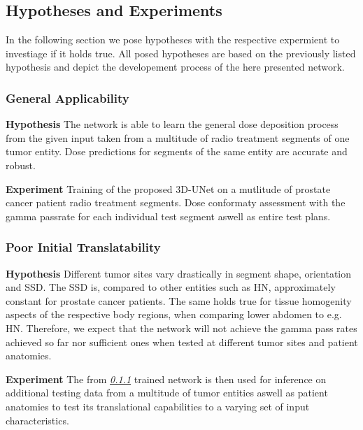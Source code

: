 \subsection{Hypotheses and Experiments}

In the following section we pose hypotheses with the respective expermient to investiage if it holds true. All posed hypotheses are based on the previously listed hypothesis and depict the developement process of the here presented network. 

\subsubsection{General Applicability}\label{sssec:H1}
\begin{hanginglist}\itemsep2pt

    \item\textbf{Hypothesis}\newline
    The network is able to learn the general dose deposition process from the given input taken from a multitude of radio treatment segments of one tumor entity. 
    Dose predictions for segments of the same entity are accurate and robust.\newpage

    \item\textbf{Experiment}\newline
    Training of the proposed 3D-UNet on a mutlitude of prostate cancer patient radio treatment segments. 
    Dose conformaty assessment with the gamma passrate for each individual test segment aswell as entire test plans.\\

\end{hanginglist}

\subsubsection{Poor Initial Translatability}\label{sssec:H2}
\begin{hanginglist}\itemsep2pt

    \item\textbf{Hypothesis}\newline
    Different tumor sites vary drastically in segment shape, orientation and \ac{SSD}. The \acs{SSD} is, compared to other entities such as \acs{HN}, approximately constant for prostate cancer patients. The same holds true for tissue homogenity aspects of the respective body regions, when comparing lower abdomen to e.g. \acs{HN}. Therefore, we expect that the network will not achieve the gamma pass rates achieved so far nor sufficient ones when tested at different tumor sites and patient anatomies.\\

    \item\textbf{Experiment}\newline
    The from \emph{\ref{sssec:H1} } trained network is then used for inference on additional testing data from a multitude of tumor entities aswell as patient anatomies to test its translational capabilities to a varying set of input characteristics. \\

\end{hanginglist}

